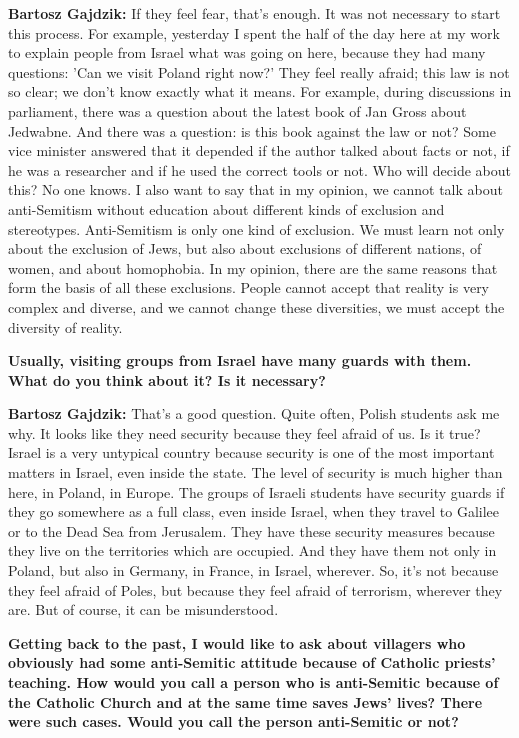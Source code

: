 \textbf{Bartosz Gajdzik:} If they feel fear, that’s enough. It was not necessary to start this process. For example, yesterday I spent the half of the day here at my work to explain people from Israel what was going on here, because they had many questions: 'Can we visit Poland right now?' They feel really afraid; this law is not so clear; we don’t know exactly what it means. For example, during discussions in parliament, there was a question about the latest book of Jan Gross about Jedwabne. And there was a question: is this book against the law or not? Some vice minister answered that it depended if the author talked about facts or not, if he was a researcher and if he used the correct tools or not. Who will decide about this? No one knows.  
I also want to say that in my opinion, we cannot talk about anti-Semitism without education about different kinds of exclusion and stereotypes. Anti-Semitism is only one kind of exclusion. We must learn not only about the exclusion of Jews, but also about exclusions of different nations, of women, and about homophobia. In my opinion, there are the same reasons that form the basis of all these exclusions. People cannot accept that reality is very complex and diverse, and we cannot change these diversities, we must accept the diversity of reality.  

\textbf{Usually, visiting groups from Israel have many guards with them. What do you think about it? Is it necessary?} 

\textbf{Bartosz Gajdzik:} That’s a good question. Quite often, Polish students ask me why. It looks like they need security because they feel afraid of us. Is it true? Israel is a very untypical country because security is one of the most important matters in Israel, even inside the state. The level of security is much higher than here, in Poland, in Europe. The groups of Israeli students have security guards if they go somewhere as a full class, even inside Israel, when they travel to Galilee or to the Dead Sea from Jerusalem. They have these security measures because they live on the territories which are occupied. And they have them not only in Poland, but also in Germany, in France, in Israel, wherever. So, it’s not because they feel afraid of Poles, but because they feel afraid of terrorism, wherever they are. But of course, it can be misunderstood.  

\textbf{Getting back to the past, I would like to ask about villagers who obviously had some anti-Semitic attitude because of Catholic priests’ teaching. How would you call a person who is anti-Semitic because of the Catholic Church and at the same time saves Jews’ lives? There were such cases. Would you call the person anti-Semitic or not?} 

